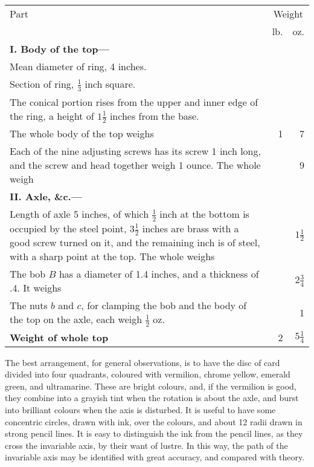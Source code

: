 \documentclass[12pt]{article}
\begin{document}
\begin{tabular}[b]{|p{}|r|r|}
\hline
Part & \multicolumn{2}{|c|}{Weight} \\ \cline{2 - 3}
       & lb.  & oz.  \\ \hline\hline
\multicolumn{3}{|l|}{\bf I.  Body of the top---} \\ \hline
\hspace{3mm}Mean diameter of ring, 4 inches.  & & \\
\hspace{3mm}Section of ring, $\frac{1}{3}$ inch square.  & & \\
\hspace{3mm}The conical portion rises from the upper and 
inner edge of the ring, a height of $1\frac{1}{2}$ inches from the base.  & & \\
\hspace{3mm}The whole body of the top weighs &1&7 \\ \hline
\hspace{3mm}Each of the nine adjusting screws has its screw 1 inch long,
and the screw and head together weigh 1 ounce.
 The whole weigh & & 9 \\ \hline
\multicolumn{3}{|l|}{\bf II.  Axle, \&c.---} \\ \hline
\hspace{3mm}Length of axle 5 inches, of which $\frac{1}{2}$ inch at the
bottom is occupied by the steel point, $3\frac{1}{2}$ inches are brass
with a good screw turned on it, and the remaining inch is of steel, with
a sharp point at the top.   The whole weighs & & $1\frac{1}{2}$ \\ \hline
\hspace{3mm}The bob $B$ has a diameter of 1.4 inches, and a 
thickness of .4.   It weighs && $2\frac{3}{4}$ \\ \hline
\hspace{3mm}The nuts $b$ and $c$, for clamping the bob and the body
of the top on the axle, each weigh $\frac{1}{2}$ oz.  && 1 \\ \hline
{\bf Weight of whole top} &2& $5\frac{1}{4}$ \\ \hline
\end{tabular}

The best arrangement, for general observations, is to have the disc of
card divided into four quadrants, coloured with vermilion, chrome
yellow, emerald green, and ultramarine.  These are bright colours,
and, if the vermilion is good, they combine into a grayish tint when
the rotation is about the axle, and burst into brilliant colours when
the axis is disturbed.  It is useful to have some concentric circles,
drawn with ink, over the colours, and about 12 radii drawn in strong
pencil lines.  It is easy to distinguish the ink from the pencil
lines, as they cross the invariable axis, by their want of lustre.  In
this way, the path of the invariable axis may be identified with great
accuracy, and compared with theory.
\end{document}
